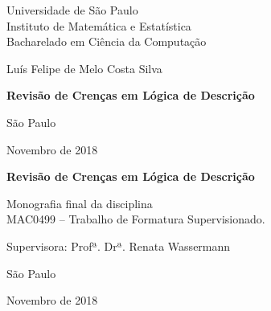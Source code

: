 \documentclass[12pt, a4paper]{book}
\begin{document}
	
	\frontmatter 
	\fancyhead[RO]{{\footnotesize\rightmark}\hspace{2em}\thepage}
	\setcounter{tocdepth}{2}
	\fancyhead[LE]{\thepage\hspace{2em}\footnotesize{\leftmark}}
	\fancyhead[RE,LO]{}
	\fancyhead[RO]{{\footnotesize\rightmark}\hspace{2em}\thepage}
	
	\onehalfspacing  %
	
	\thispagestyle{empty}
	\begin{center}
		\vspace*{2.3cm}
		Universidade de São Paulo\\
		Instituto de Matemática e Estatística\\
		Bacharelado em Ciência da Computação
		
		
		\vspace*{3cm}
		\Large{Luís Felipe de Melo Costa Silva}
		
		
		\vspace{3cm}
		\textbf{Revisão de Crenças em Lógica de Descrição}
		
		
		\vskip 5cm
		\normalsize{São Paulo}
		
		\normalsize{Novembro de 2018}
	\end{center}
	
	\newpage
	\thispagestyle{empty}
	\begin{center}
		\vspace*{2.3 cm}
		\textbf{\Large{Revisão de Crenças em Lógica de Descrição}}
		\vspace*{2 cm}
	\end{center}
	
	\vskip 2cm
	
	\begin{flushright}
		Monografia final da disciplina \\
		MAC0499 -- Trabalho de Formatura Supervisionado.
	\end{flushright}
	
	\vskip 5cm
	
	\begin{center}
		Supervisora: Profª. Drª. Renata Wassermann
		
		\vskip 5cm
		\normalsize{São Paulo}
		
		\normalsize{Novembro de 2018}
	\end{center}
	\pagebreak
	
\end{document}
